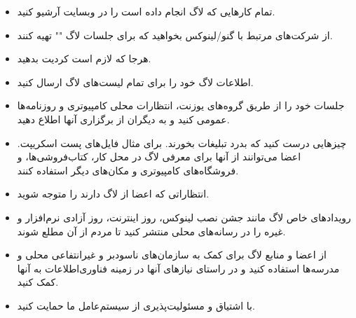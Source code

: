 \begin{itemize}
\item
تمام کارهایی که لاگ انجام داده است را در وبسایت آرشیو کنید.
\item
از شرکت‌های مرتبط با گنو/لینوکس بخواهید که برای جلسات لاگ
""
تهیه کنند.
\item
هرجا که لازم است کردیت بدهید.
\item
اطلاعات لاگ خود را برای تمام لیست‌های لاگ ارسال کنید.
\item
جلسات‌ خود را از طریق گروه‌های یوزنت، انتظارات محلی کامپیوتری و روزنامه‌ها
عمومی کنید و به دیگران از برگزاری آنها اطلاع دهید.
\item
چیزهایی درست کنید که بدرد تبلیغات بخورند. برای مثال فایل‌های پست اسکریپت.
اعضا می‌توانند از آنها برای معرفی لاگ در محل کار، کتاب‌فروشی‌ها، و فروشگاه‌های کامپیوتری
و مکان‌های دیگر استفاده کنند.
\item
انتظاراتی که اعضا از لاگ دارند را متوجه شوید.
\item
رویدادهای خاص لاگ مانند جشن نصب لینوکس، روز اینترنت، روز آزادی نرم‌افزار
و غیره را در رسانه‌های محلی منتشر کنید تا مردم از آن مطلع شوند.
\item
از اعضا و منابع لاگ برای کمک به سازمان‌های ناسودبر و غیرانتفاعی محلی
و مدرسه‌ها استفاده کنید و در راستای نیازهای آنها در زمینه فناوری‌اطلاعات
به آنها کمک کنید.
\item
با اشتیاق و مسئولیت‌پذیری از سیستم‌عامل ما حمایت کنید.

\end{itemize}
